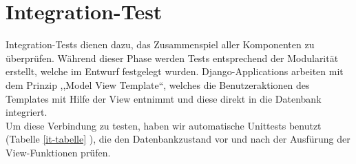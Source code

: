 \documentclass[parskip=full,11pt]{scrartcl}
\begin{document}
\begin{longtable}[c]{|p{0.4cm}|P{2.5cm}|p{3.5cm}|p{5cm}|p{3cm}|}
                  
\end{longtable}
\newpage


\section{Integration-Test} \label{integrationtest}
Integration-Tests dienen dazu, das Zusammenspiel aller Komponenten zu \"uberpr\"ufen. W\"ahrend dieser Phase werden Tests entsprechend der Modularit\"at erstellt, welche im Entwurf festgelegt wurden. Django-Applications arbeiten mit dem Prinzip ,,Model View Template``, welches die Benutzeraktionen des Templates mit Hilfe der View entnimmt und diese direkt in die Datenbank integriert.\\
Um diese Verbindung zu testen, haben wir automatische Unittests benutzt (Tabelle \ref{it-tabelle} ), die den Datenbankzustand vor und nach der Ausf\"urung der View-Funktionen pr\"ufen.\\
\end{document}
